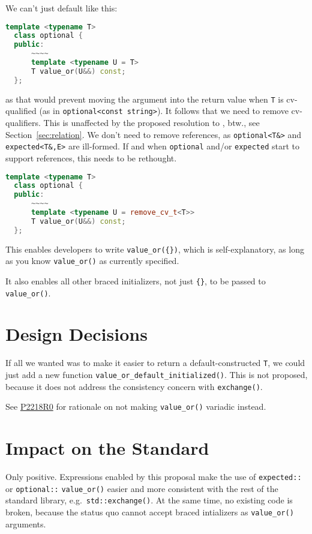 \documentclass[11pt]{article}
\newcommand{\wgpaper}[1]{\href{https://wg21.link/#1}{#1}}
\begin{document}
We can't just default like this:

\begin{lstlisting}[language=c++]
  template <typename T>
  class optional {
  public:
      ~~~~
      template <typename U = T>
      T value_or(U&&) const;
  };
\end{lstlisting}

as that would prevent moving the argument into the return value when
\texttt{T} is cv-qualified (as in \texttt{optional<const string>}). It
follows that we need to remove cv-qualifiers. This is unaffected by
the proposed resolution to \cite{LWG3424}, btw., see
Section~\ref{sec:relation}. We don't need to remove references, as
\texttt{optional<T\&>} and \texttt{expected<T\&,E>} are ill-formed. If
and when \texttt{optional} and/or \texttt{expected} start to support
references, this needs to be rethought.

\begin{lstlisting}[language=c++]
  template <typename T>
  class optional {
  public:
      ~~~~
      template <typename U = remove_cv_t<T>>
      T value_or(U&&) const;
  };
\end{lstlisting}

This enables developers to write \texttt{value\_or(\{\})}, which is
self-explanatory, as long as you know \texttt{value\_or()} as
currently specified.

It also enables all other braced initializers, not just \texttt{\{\}},
to be passed to \texttt{value\_or()}.

\section{Design Decisions}

If all we wanted was to make it easier to return a default-constructed
\texttt{T}, we could just add a new function
\texttt{value\_or\_default\_initialized()}. This is not proposed,
because it does not address the consistency concern with
\texttt{exchange()}.

See \wgpaper{P2218R0} for rationale on not making \texttt{value\_or()}
variadic instead.

\section{Impact on the Standard}

Only positive. Expressions enabled by this proposal make the use of
\texttt{expected::} or \texttt{optional::} \texttt{value\_or()} easier
and more consistent with the rest of the standard library,
e.g.~\texttt{std::exchange()}. At the same time, no existing code is
broken, because the status quo cannot accept braced intializers as
\texttt{value\_or()} arguments.
\end{document}

